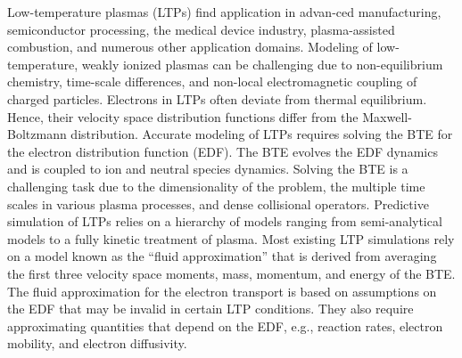 Low-temperature plasmas (LTPs) find application in advan-ced manufacturing, semiconductor processing, the medical device industry, plasma-assisted combustion, and numerous other application domains. Modeling of low-temperature, weakly ionized plasmas can be challenging due to non-equilibrium chemistry, time-scale differences, and non-local electromagnetic coupling of charged particles. Electrons in LTPs often deviate from thermal equilibrium. Hence, their velocity space distribution functions differ from the Maxwell-Boltzmann distribution. Accurate modeling of LTPs requires solving the BTE for the electron distribution function (EDF). The BTE evolves the EDF dynamics and is coupled to ion and neutral species dynamics. Solving the BTE is a challenging task due to the dimensionality of the problem, the multiple time scales in various plasma processes, and dense collisional operators. Predictive simulation of LTPs relies on a hierarchy of models ranging from semi-analytical models to a fully kinetic treatment of plasma. Most existing LTP simulations rely on a model known as the ``fluid approximation'' that is derived from averaging the first three velocity space moments, mass, momentum, and energy of the BTE. The fluid approximation for the electron transport is based on assumptions on the EDF that may be invalid in certain LTP conditions. They also require approximating quantities that depend on the EDF, e.g., reaction rates, electron mobility, and electron diffusivity.

